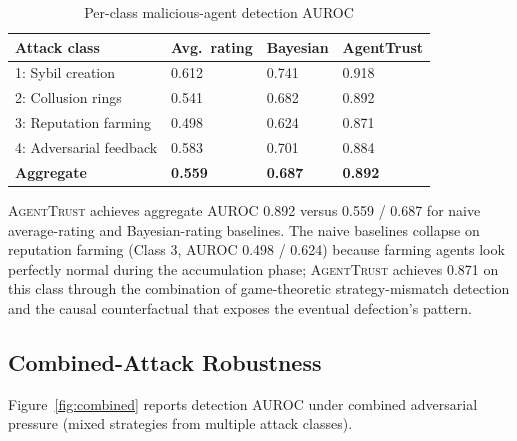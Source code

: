 \documentclass[sigconf,nonacm]{acmart}
\begin{document}
\begin{table}[h]
\caption{Per-class malicious-agent detection AUROC}
\label{tab:perclass}
\small
\begin{tabularx}{\columnwidth}{@{}p{2.6cm}X X X@{}}
\toprule
\textbf{Attack class} & \textbf{Avg.\ rating} & \textbf{Bayesian} & \textbf{AgentTrust} \\
\midrule
1: Sybil creation       & 0.612 & 0.741 & 0.918 \\
2: Collusion rings      & 0.541 & 0.682 & 0.892 \\
3: Reputation farming   & 0.498 & 0.624 & 0.871 \\
4: Adversarial feedback & 0.583 & 0.701 & 0.884 \\
\midrule
\textbf{Aggregate}      & \textbf{0.559} & \textbf{0.687} & \textbf{0.892} \\
\bottomrule
\end{tabularx}
\end{table}

\textsc{AgentTrust} achieves aggregate AUROC 0.892 versus 0.559 /
0.687 for naive average-rating and Bayesian-rating baselines. The
naive baselines collapse on reputation farming (Class 3, AUROC
0.498 / 0.624) because farming agents look perfectly normal during
the accumulation phase; \textsc{AgentTrust} achieves 0.871 on this
class through the combination of game-theoretic strategy-mismatch
detection and the causal counterfactual that exposes the eventual
defection's pattern.

\subsection{Combined-Attack Robustness}

Figure~\ref{fig:combined} reports detection AUROC under combined
adversarial pressure (mixed strategies from multiple attack classes).
\end{document}

